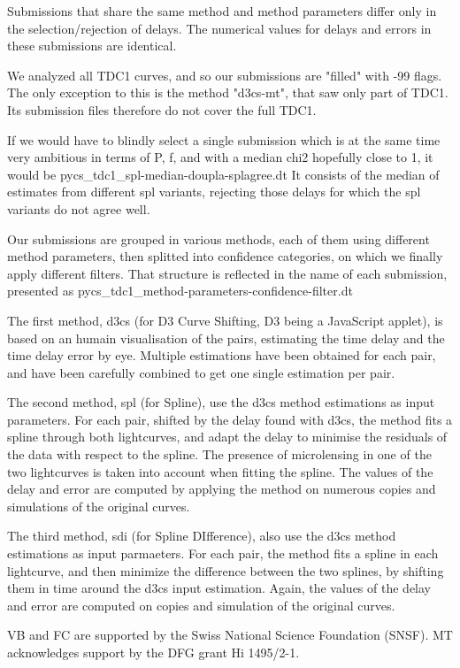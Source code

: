 \documentclass[traditabstract]{aa}
\begin{document}
Submissions that share the same method and method parameters differ only in the selection/rejection of delays. The numerical values for delays and errors in these submissions are identical.

We analyzed all TDC1 curves, and so our submissions are "filled" with -99 flags. The only exception to this is the method "d3cs-mt", that saw only part of TDC1. Its submission files therefore do not cover the full TDC1.

If we would have to blindly select a single submission which is at the same time very ambitious in terms of P, f, and with a median chi2 hopefully close to 1, it would be
pycs\_tdc1\_spl-median-doupla-splagree.dt
It consists of the median of estimates from different spl variants, rejecting those delays for which the spl variants do not agree well.


Our submissions are grouped in various methods, each of them using different method parameters, then splitted into confidence categories, on which we finally apply different filters. That structure is reflected in the name of each submission, presented as pycs\_tdc1\_method-parameters-confidence-filter.dt

The first method, d3cs (for D3 Curve Shifting, D3 being a JavaScript applet), is based on an humain visualisation of the pairs, estimating the time delay and the time delay error by eye. Multiple estimations have been obtained for each pair, and have been carefully combined to get one single estimation per pair.

The second method, spl (for Spline), use the d3cs method estimations as input parameters. For each pair, shifted by the delay found with d3cs, the method fits a spline through both lightcurves, and adapt the delay to minimise the residuals of the data with respect to the spline. The presence of microlensing in one of the two lightcurves is taken into account when fitting the spline. The values of the delay and error are computed by applying the method on numerous copies and simulations of the original curves.

The third method, sdi (for Spline DIfference), also use the d3cs method estimations as input parmaeters. For each pair, the method fits a spline in each lightcurve, and then minimize the difference between the two splines, by shifting them in time around the d3cs input estimation. Again, the values of the delay and error are computed on copies and simulation of the original curves.

\citep{pycs}


\begin{acknowledgements}
VB and FC are supported by the Swiss National Science Foundation (SNSF). MT acknowledges support by the DFG grant Hi 1495/2-1.
\end{acknowledgements}





\end{document}
